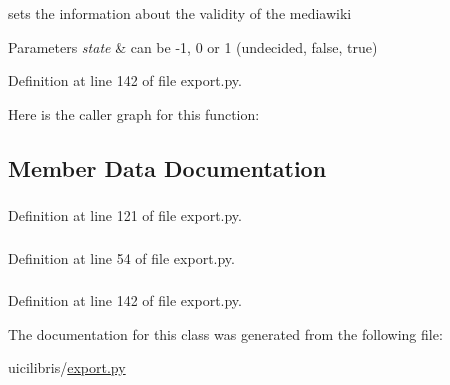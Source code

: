 sets the information about the validity of the mediawiki 


\begin{DoxyParams}{\-Parameters}
{\em state} & can be -\/1, 0 or 1 (undecided, false, true) \\
\hline
\end{DoxyParams}


\-Definition at line 142 of file export.\-py.



\-Here is the caller graph for this function\-:




\subsection{\-Member \-Data \-Documentation}
\hypertarget{classuicilibris_1_1export_1_1Dialog_a07b5b263e584b16737c942d6d3ca5596}{
\subsubsection[{log\-State}]{}}\label{classuicilibris_1_1export_1_1Dialog_a07b5b263e584b16737c942d6d3ca5596}


\-Definition at line 121 of file export.\-py.

\hypertarget{classuicilibris_1_1export_1_1Dialog_add11c198e76e3e171a8190fa212efef8}{
\subsubsection[{ui}]{}}\label{classuicilibris_1_1export_1_1Dialog_add11c198e76e3e171a8190fa212efef8}


\-Definition at line 54 of file export.\-py.

\hypertarget{classuicilibris_1_1export_1_1Dialog_a59b9eaf6e32eb4de8ade1f1492f20a7c}{
\subsubsection[{valid\-State}]{}}\label{classuicilibris_1_1export_1_1Dialog_a59b9eaf6e32eb4de8ade1f1492f20a7c}


\-Definition at line 142 of file export.\-py.



\-The documentation for this class was generated from the following file\-:\begin{DoxyCompactItemize}
\item 
uicilibris/\hyperlink{export_8py}{export.\-py}\end{DoxyCompactItemize}

